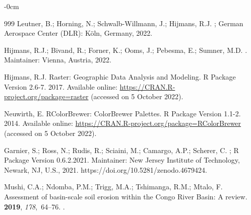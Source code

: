 \documentclass[applsci,article,accept,pdftex,moreauthors]{Definitions/mdpi}
\begin{document}
\begin{adjustwidth}{-\extralength}{0cm}
\begin{thebibliography}{999}
Leutner, B.; Horning, N.; Schwalb-Willmann, J.; Hijmans, R.J.
;  \newblock German Aerospace Center (DLR): K\"oln, Germany, 2022. %

{Hijmans, R.J.; Bivand, R.;  Forner, K.; Ooms, J.; Pebesma, E.; Sumner, M.D.}
.
\newblock Maintainer: Vienna, Austria, %
  2022.

Hijmans, R.J.
\newblock Raster: Geographic Data Analysis and Modeling. R Package Version
  2.6-7.  2017.
\newblock  Available online: \url{https://CRAN.R-project.org/package=raster}  (accessed on 5 October 2022). %


Neuwirth, E.
\newblock RColorBrewer: ColorBrewer Palettes. R Package Version 1.1-2.  2014. Available online: \url{https://CRAN.R-project.org/package=RColorBrewer}  (accessed on 5 October 2022). %

Garnier, S.; Ross, N.; Rudis, R.; Sciaini, M.; Camargo, A.P.; Scherer, C.
;
\newblock R Package Version 0.6.2.2021. 
\newblock Maintainer: New Jersey Institute of Technology, Newark, NJ, U.S., 2021. %
  {{https://doi.org/10.5281/zenodo.4679424}}.

Mushi, C.A.; Ndomba, P.M.; Trigg, M.A.; Tshimanga, R.M.; Mtalo, F.
\newblock Assessment of basin-scale soil erosion within the Congo River Basin:
  A review.
 {\bf 2019}, {\em 178},~64--76.
.


\end{thebibliography}
\end{adjustwidth}
\end{document}
